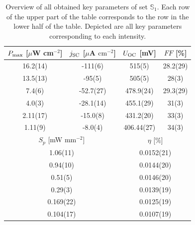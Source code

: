 \documentclass[a4paper,10pt,twocolumn]{article}
\begin{document}
\begin{extract*}
\begin{table}[h]
	\caption{Overview of all obtained key parameters of set $\mathbb{S}_1$. Each row of the upper part of the table corresponds to the row in the lower half of the table. Depicted are all key parameters corresponding to each intensity.}
	\label{tab:OSC3table}
	\begin{tabular}{@{}cccc@{}}
		\toprule
		$P_{\text{max}}$ [$\mu$W cm$^{-2}$] & $j_{\text{SC}}$ [$\mu$A $\mathrm{cm}^{-2}$] & $U_{\text{OC}}$ [mV]     & $FF$ [\%]     \\ \midrule
		16.2(14)                   & -111(6)                            & 515(5)          & 28.2(29)      \\
		13.5(13)                   & -95(5)                             & 505(5)          & 28(3)         \\
		7.4(6)                     & -52.7(27)                          & 478.9(24)       & 29.3(29)      \\
		4.0(3)                     & -28.1(14)                          & 455.1(29)       & 31(3)         \\
		2.11(17)                   & -15.0(8)                           & 431.2(20)       & 33(3)         \\
		1.11(9)                    & -8.0(4)                            & 406.44(27)      & 34(3)         \\ \midrule
		\multicolumn{2}{c}{$S_p$ [mW mm$^{-2}$]}                        & \multicolumn{2}{c}{$\eta$ [\%]} \\ \midrule
		\multicolumn{2}{c}{1.06(11)}                                    & \multicolumn{2}{c}{0.0152(21)}  \\
		\multicolumn{2}{c}{0.94(10)}                                    & \multicolumn{2}{c}{0.0144(20)}  \\
		\multicolumn{2}{c}{0.51(5)}                                     & \multicolumn{2}{c}{0.0146(20)}  \\
		\multicolumn{2}{c}{0.29(3)}                                     & \multicolumn{2}{c}{0.0139(19)}  \\
		\multicolumn{2}{c}{0.169(22)}                                   & \multicolumn{2}{c}{0.0125(19)}  \\
		\multicolumn{2}{c}{0.104(17)}                                   & \multicolumn{2}{c}{0.0107(19)}  \\ \bottomrule
	\end{tabular}
\end{table}



\end{extract*}
\end{document}
